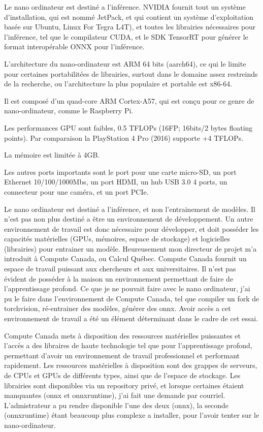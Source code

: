 ﻿
\par Le nano ordinateur est destiné a l'inférence. NVIDIA fournit tout un système d'installation, qui est nommé JetPack, et qui contient un système d'exploitation basée sur Ubuntu, Linux For Tegra L4T), et toutes les librairies nécessaires pour l'inférence, tel que le compilateur CUDA, et le SDK TensorRT pour générer le format interopérable ONNX pour l'inférence.
\par L'architecture du nano-ordinateur est ARM 64 bits (aarch64), ce qui le limite pour certaines portabilitées de librairies, surtout dans le domaine assez restreinds de la recherche, ou l'architecture la plus populaire et portable est x86-64. 
\par Il est composé d'un quad-core ARM Cortex-A57, qui est conçu pour ce genre de nano-ordinateur, comme le Raspberry Pi.
\par Les performances GPU sont faibles, 0.5 TFLOPs (16FP; 16bits/2 bytes floating points). Par comparaison la PlayStation 4 Pro (2016) supporte +4 TFLOPs. 
\par La mémoire est limitée à 4GB. 
\par Les autres ports importants sont le port pour une carte micro-SD, un port Ethernet 10/100/1000Mbs, un port HDMI, un hub USB 3.0 4 ports, un connecteur pour une caméra, et un port PCIe.
\par Le nano ordinateur est destiné a l'inférence, et non l'entrainement de modèles. Il n'est pas non plus destiné a être un environnement de développement. Un autre environnement de travail est donc nécessaire pour développer, et doit posséder les capacités matérielles (GPUs, mémoires, espace de stockage) et logicielles (librairies) pour entrainer un modèle. Heureusement mon directeur de projet m'a introduit à Compute Canada, ou Calcul Québec. Compute Canada fournit un espace de travail puissant aux chercheurs et aux universitaires. Il n'est pas évident de posséder à la maison un environnement permettant de faire de l'apprentissage profond. Ce que je ne pouvait faire avec le nano ordinateur, j'ai pu le faire dans l'environnement de Compute Canada, tel que compiler un fork de torchvision, ré-entrainer des modèles, générer des onnx. Avoir accès a cet environnement de travail a été un élément déterminant dans le cadre de cet essai.
\par Compute Canada mets à disposition des ressources matérielles puissantes et l'accès a des libraires de haute technologie tel que pour l'apprentissage profond, permettant d'avoir un environnement de travail professionnel et performant rapidement. Les ressources matérielles à disposition sont des grappes de serveurs, de CPUs et GPUs de différents types, ainsi que de l'espace de stockage. Les librairies sont disponibles via un repository privé, et lorsque certaines étaient manquantes (onnx et onnxruntime), j'ai fait une demande par courriel. L'admistrateur a pu rendre disponible l'une des deux (onnx), la seconde (onnxruntime) étant beaucoup plus complexe a installer, pour l'avoir tenter sur le nano-ordinateur. 

